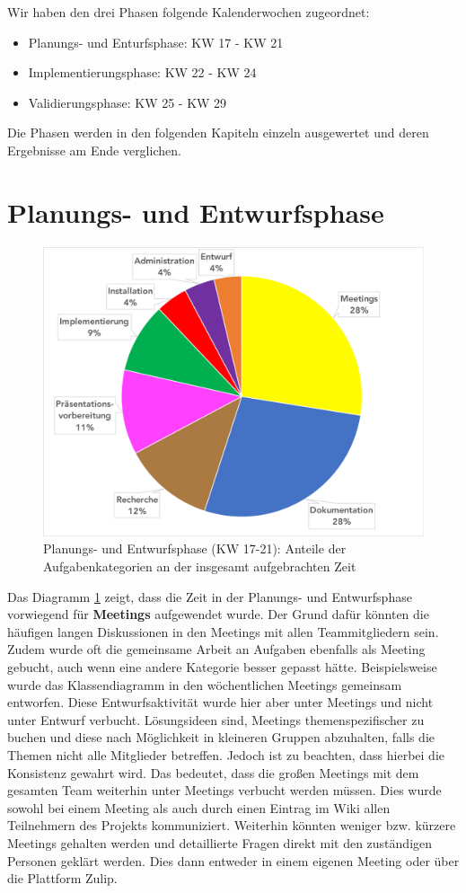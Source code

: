 \documentclass[../review_2.tex]{subfiles}
\begin{document}
Wir haben den drei Phasen folgende Kalenderwochen zugeordnet:
\begin{itemize}
    \item Planungs- und Enturfsphase: KW 17 - KW 21
    \item Implementierungsphase: KW 22 - KW 24
    \item Validierungsphase: KW 25 - KW 29
\end{itemize}
Die Phasen werden in den folgenden Kapiteln einzeln ausgewertet und deren Ergebnisse am Ende verglichen.
\section{Planungs- und Entwurfsphase}

\begin{figure} [h]
   \centering
   \includegraphics[width = \linewidth]{img/Kimai1.pdf}
    \caption{Planungs- und Entwurfsphase (KW 17-21): Anteile der Aufgabenkategorien an der insgesamt aufgebrachten Zeit}
    \label{kategorien}
\end{figure} 

Das Diagramm \ref{kategorien} zeigt, dass die Zeit in der Planungs- und Entwurfsphase vorwiegend für \textbf{Meetings} aufgewendet wurde. Der Grund dafür könnten die häufigen langen Diskussionen in den Meetings mit allen Teammitgliedern sein. Zudem wurde oft die gemeinsame Arbeit an Aufgaben ebenfalls als Meeting gebucht, auch wenn eine andere Kategorie besser gepasst hätte. Beispielsweise wurde das Klassendiagramm in den wöchentlichen Meetings gemeinsam entworfen. Diese Entwurfsaktivität wurde hier aber unter Meetings und nicht unter Entwurf verbucht. Lösungsideen sind, Meetings themenspezifischer zu buchen und diese nach Möglichkeit in kleineren Gruppen abzuhalten, falls die Themen nicht alle Mitglieder betreffen. Jedoch ist zu beachten, dass hierbei die Konsistenz gewahrt wird. Das bedeutet, dass die \glqq großen\grqq{} Meetings mit dem gesamten Team weiterhin unter Meetings verbucht werden müssen. Dies wurde sowohl bei einem Meeting als auch durch einen Eintrag im Wiki allen Teilnehmern des Projekts kommuniziert. Weiterhin könnten weniger bzw. kürzere Meetings gehalten werden und detaillierte Fragen direkt mit den zuständigen Personen geklärt werden. Dies dann entweder in einem eigenen Meeting oder über die Plattform Zulip.
\end{document}
